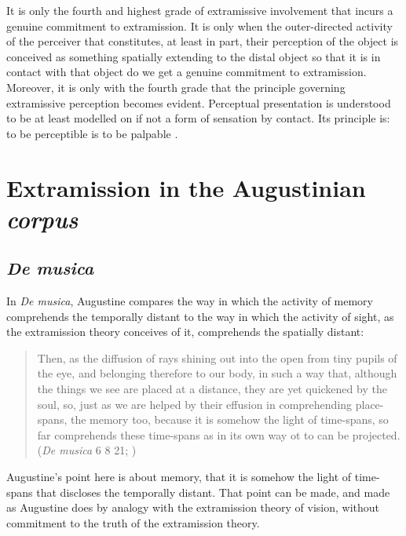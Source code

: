 \documentclass[12pt]{article}
\begin{document}
It is only the fourth and highest grade of extramissive involvement that incurs a genuine commitment to extramission. It is only when the outer-directed activity of the perceiver that constitutes, at least in part, their perception of the object is conceived as something spatially extending to the distal object so that it is in contact with that object do we get a genuine commitment to extramission. Moreover, it is only with the fourth grade that the principle governing extramissive perception becomes evident. Perceptual presentation is understood to be at least modelled on if not a form of sensation by contact. Its principle is: to be perceptible is to be palpable \citep[see][for discussion]{Kalderon:2015fr}.


\section{Extramission in the Augustinian \emph{corpus}} %
\label{sec:extramission_in_the_augustinian_emph_corpus}

\subsection{\emph{De musica}} %
\label{sub:subsection_name}

In \emph{De musica}, Augustine compares the way in which the activity of memory comprehends the temporally distant to the way in which the activity of sight, as the extramission theory conceives of it, comprehends the spatially distant:
\begin{quote}
	Then, as the diffusion of rays shining out into the open from tiny pupils of the eye, and belonging therefore to our body, in such a way that, although the things we see are placed at a distance, they are yet quickened by the soul, so, just as we are helped by their effusion in comprehending place-spans, the memory too, because it is somehow the light of time-spans, so far comprehends these time-spans as in its own way ot to can be projected. (\emph{De musica} 6 8 21; \citealt[346]{Taliaferro:1947aa})
\end{quote}
Augustine's point here is about memory, that it is somehow the light of time-spans that discloses the temporally distant. That point can be made, and made as Augustine does by analogy with the extramission theory of vision, without commitment to the truth of the extramission theory.

\end{document}
